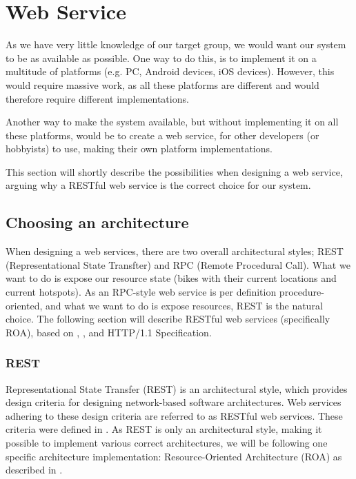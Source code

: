 \section{Web Service}
As we have very little knowledge of our target group, we would want our system to be as available as possible.
One way to do this, is to implement it on a multitude of platforms (e.g. PC, Android devices, iOS devices).
However, this would require massive work, as all these platforms are different and would therefore require different implementations.

Another way to make the system available, but without implementing it on all these platforms, would be to create a web service, for other developers (or hobbyists) to use, making their own platform implementations.

This section will shortly describe the possibilities when designing a web service, arguing why a RESTful web service is the correct choice for our system.

\subsection{Choosing an architecture}
When designing a web services, there are two overall architectural styles; REST (Representational State Transfter) and RPC (Remote Procedural Call).
What we want to do is expose our resource state (bikes with their current locations and current hotspots).
As an RPC-style web service is per definition procedure-oriented, and what we want to do is expose resources, REST is the natural choice.
The following section will describe RESTful web services (specifically ROA), based on  \citet{restful_web_services}, \citet{fielding_dissertation}, and HTTP/1.1 Specification\cite{http_specification}.

\subsubsection{REST}
Representational State Transfer (REST) is an architectural style, which provides design criteria for designing network-based software architectures.
Web services adhering to these design criteria are referred to as RESTful web services.
These criteria were defined in \citet{fielding_dissertation}.
As REST is only an architectural style, making it possible to implement various correct architectures, we will be following one specific architecture implementation: Resource-Oriented Architecture (ROA) as described in \citet{restful_web_services}.

